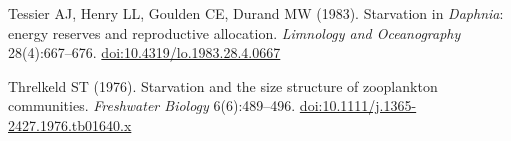 \item Tessier AJ, Henry LL, Goulden CE, Durand MW (1983). Starvation in \emph{Daphnia}: energy reserves and reproductive allocation. \emph{Limnology and Oceanography} 28(4):667–676. \href{https://doi.org/10.4319/lo.1983.28.4.0667}{doi:10.4319/lo.1983.28.4.0667}
\item Threlkeld ST (1976). Starvation and the size structure of zooplankton communities. \emph{Freshwater Biology} 6(6):489–496. \href{https://doi.org/10.1111/j.1365-2427.1976.tb01640.x}{doi:10.1111/j.1365-2427.1976.tb01640.x}
